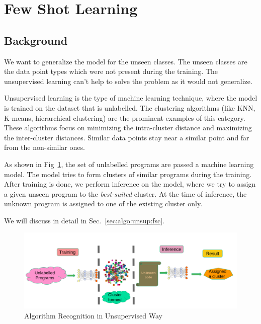 \section{Few Shot Learning}\label{sec:algo:unsup}
\subsection{Background}
We want to generalize the model for the unseen classes. The unseen classes are the data point types which were not present during the training. The unsupervised learning can't help to solve the problem as it would not generalize.

Unsupervised learning is the type of machine learning technique, where the model is trained on the dataset that is unlabelled. The clustering algorithms (like KNN, K-means, hierarchical clustering) are the prominent examples of this category. 
These algorithms focus on minimizing the intra-cluster distance and maximizing the inter-cluster distances. Similar data points stay near a similar point and far from the non-similar ones.

As shown in Fig~\ref{fig:unsupervised-background}, the set of unlabelled programs are passed a  machine learning model. The model tries to form clusters of similar programs during the training. After training is done, we perform inference on the model, where we try to assign a given unseen program to the \textit{best-suited} cluster. At the time of inference, the unknown program is assigned to one of the existing cluster only.  

 We will discuss in detail in Sec.~\ref{sec:algo:unsup:fsc}. 


\begin{figure}[t]
    \centering
    \includegraphics[scale=0.4]{figures/chapter-3/unsupervised.png}
    \caption{Algorithm Recognition in Unsupervised Way}
     \label{fig:unsupervised-background}
\end{figure}

